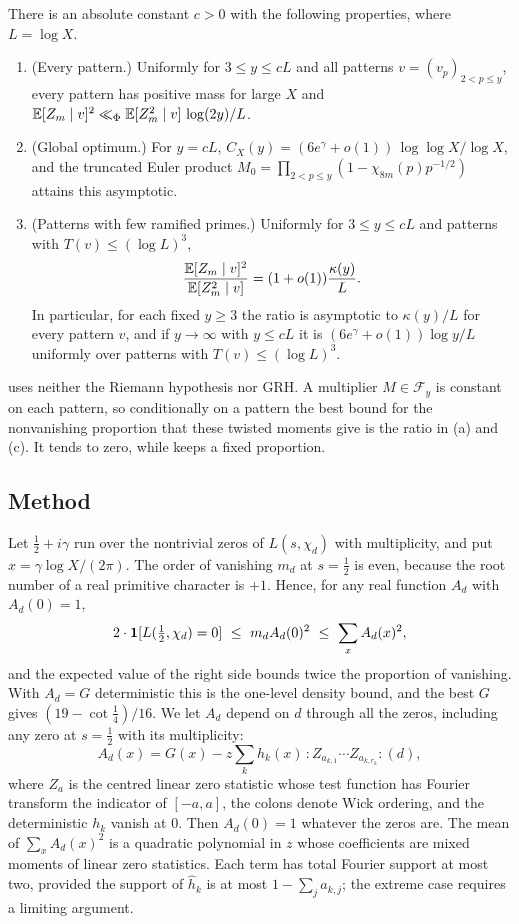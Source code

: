 \documentclass[11pt,colorlinks]{charlie}
\newcommand{\Wk}[1]{{:}#1{:}}
\begin{document}
\begin{theorem}\label{thm:twomoment}
There is an absolute constant $c>0$ with the following properties, where $L=\log X$.
\begin{enumerate}[label=(\alph*)]
\item (Every pattern.) Uniformly for $3\le y\le cL$ and all patterns $v=(v_p)_{2<p\le y}$, every pattern has positive mass for large $X$ and
$\mathbb{E}[Z_m\mid v]^2\ll_\Phi\mathbb{E}[Z_m^2\mid v]\,\log(2y)/L$.
\item (Global optimum.) For $y=cL$, $C_X(y)=(6e^\gamma+o(1))\,\log\log X/\log X$, and the truncated Euler product $M_0=\prod_{2<p\le y}(1-\chi_{8m}(p)p^{-1/2})$ attains this asymptotic.
\item (Patterns with few ramified primes.) Uniformly for $3\le y\le cL$ and patterns with $T(v)\le(\log L)^3$,
\[
 \frac{\mathbb{E}[Z_m\mid v]^2}{\mathbb{E}[Z_m^2\mid v]}=(1+o(1))\frac{\kappa(y)}{L}.
\]
In particular, for each fixed $y\ge3$ the ratio is asymptotic to $\kappa(y)/L$ for every pattern $v$, and if $y\to\infty$ with $y\le cL$ it is $(6e^\gamma+o(1))\log y/L$ uniformly over patterns with $T(v)\le(\log L)^3$.
\end{enumerate}
\end{theorem}

 uses neither the Riemann hypothesis nor GRH. A multiplier $M\in\mathcal F_y$ is constant on each pattern, so conditionally on a pattern the best bound for the nonvanishing proportion that these twisted moments give is the ratio in (a) and (c). It tends to zero, while  keeps a fixed proportion.

\subsection{Method}
Let $\tfrac12+i\gamma$ run over the nontrivial zeros of $L(s,\chi_d)$ with multiplicity, and put $x=\gamma\log X/(2\pi)$. The order of vanishing $m_d$ at $s=\tfrac12$ is even, because the root number of a real primitive character is $+1$. Hence, for any real function $A_d$ with $A_d(0)=1$,
\[
 2\cdot\one[L(\tfrac12,\chi_d)=0]\ \le\ m_dA_d(0)^2\ \le\ \sum_xA_d(x)^2 ,
\]
and the expected value of the right side bounds twice the proportion of vanishing. With $A_d=G$ deterministic this is the one-level density bound, and the best $G$ gives $(19-\cot\tfrac14)/16$. We let $A_d$ depend on $d$ through all the zeros, including any zero at $s=\tfrac12$ with its multiplicity:
\[
 A_d(x)=G(x)-z\sum_kh_k(x)\,\Wk{Z_{a_{k,1}}\cdots Z_{a_{k,r_k}}}(d),
\]
where $Z_a$ is the centred linear zero statistic whose test function has Fourier transform the indicator of $[-a,a]$, the colons denote Wick ordering, and the deterministic $h_k$ vanish at $0$. Then $A_d(0)=1$ whatever the zeros are. The mean of $\sum_xA_d(x)^2$ is a quadratic polynomial in $z$ whose coefficients are mixed moments of linear zero statistics. Each term has total Fourier support at most two, provided the support of $\widehat h_k$ is at most $1-\sum_ja_{k,j}$; the extreme case requires a limiting argument.
\end{document}
